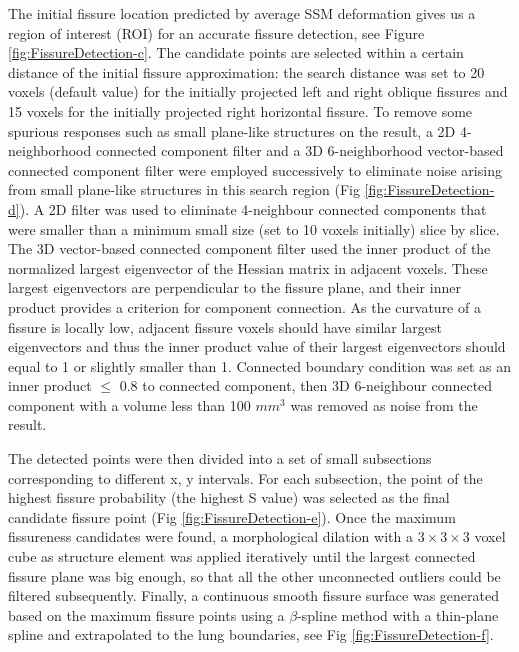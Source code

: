 {The initial fissure location predicted by average SSM deformation gives us a region of interest (ROI) for an accurate fissure detection, see Figure \ref{fig:FissureDetection-c}. The candidate points are selected within a certain distance of the initial fissure approximation: the search distance was set to 20 voxels (default value) for the initially projected left and right oblique fissures and 15 voxels for the initially projected right horizontal fissure. To remove some spurious responses such as small plane-like structures on the result, a 2D 4-neighborhood connected component filter and a 3D 6-neighborhood vector-based connected component filter were employed successively to eliminate noise arising from small plane-like structures in this search region (Fig \ref{fig:FissureDetection-d}). A 2D filter was used to eliminate 4-neighbour connected components that were smaller than a minimum small size (set to 10 voxels initially) slice by slice. The 3D vector-based connected component filter used the inner product of the normalized largest eigenvector of the Hessian matrix in adjacent voxels. These largest eigenvectors are perpendicular to the fissure plane, and their inner product provides a criterion for component connection. As the curvature of a fissure is locally low, adjacent fissure voxels should have similar largest eigenvectors and thus the inner product value of their largest eigenvectors should equal to 1 or slightly smaller than 1. Connected boundary condition was set as an inner product $\leq$ 0.8 to connected component, then 3D 6-neighbour connected component with a volume less than 100 \textsl{$mm^3$} was removed as noise from the result.

The detected points were then divided into a set of small subsections corresponding to different x, y intervals. For each subsection, the point of the highest fissure probability (the highest S value) was selected as the final candidate fissure point (Fig \ref{fig:FissureDetection-e}). Once the maximum fissureness candidates were found, a morphological dilation with a $3\times3\times3$ voxel cube as structure element was applied iteratively until the largest connected fissure plane was big enough, so that all the other unconnected outliers could be filtered subsequently. Finally, a continuous smooth fissure surface was generated based on the maximum fissure points using a $\beta$-spline method with a thin-plane spline \citep{lee1997scattered} and extrapolated to the lung boundaries, see Fig \ref{fig:FissureDetection-f}.

}
